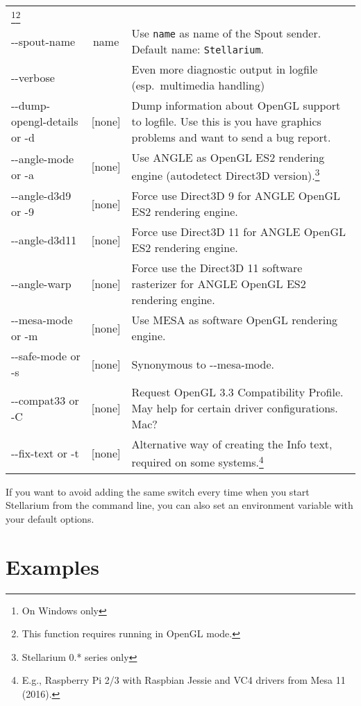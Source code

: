 \begin{longtable}{l|c|p{68mm}}
                                    \footnote{On Windows only}\footnote{This function requires running in OpenGL mode.}\\
-\/-spout-name       & name       & Use \texttt{name} as name of the Spout sender. Default name: \texttt{Stellarium}.\footnotemark[1]\\\midrule									
-\/-verbose          &            & Even more diagnostic output in logfile (esp.\ multimedia handling)\\
-\/-dump-opengl-details or -d     & {[}none{]} & Dump information about OpenGL support to logfile. 
                                                 Use this is you have graphics problems and want to send a bug report. \\\midrule
-\/-angle-mode or -a & {[}none{]} & Use ANGLE as OpenGL ES2 rendering engine (autodetect Direct3D version).\footnotemark[1]\footnote{Stellarium 0.* series only}\\
-\/-angle-d3d9 or -9 & {[}none{]} & Force use Direct3D 9 for ANGLE OpenGL ES2 rendering engine.\footnotemark[1]\footnotemark[3]\\
-\/-angle-d3d11      & {[}none{]} & Force use Direct3D 11 for ANGLE OpenGL ES2 rendering engine.\footnotemark[1]\footnotemark[3]\\
-\/-angle-warp       & {[}none{]} & Force use the Direct3D 11 software rasterizer for ANGLE OpenGL ES2 rendering engine.\footnotemark[1]\footnotemark[3]\\
-\/-mesa-mode or -m  & {[}none{]} & Use MESA as software OpenGL rendering engine.\footnotemark[1]\\
-\/-safe-mode or -s  & {[}none{]} & Synonymous to -\/-mesa-mode.\footnotemark[1]\\
-\/-compat33 or -C   & {[}none{]} & Request OpenGL 3.3 Compatibility Profile. May help for certain driver configurations. Mac?\\
-\/-fix-text or -t   & {[}none{]} & Alternative way of creating the Info text, required on some systems.\footnote{E.g., Raspberry Pi 2/3 with Raspbian Jessie and VC4 drivers from Mesa 11 (2016).}\\\bottomrule
\end{longtable}

\noindent {} If you want to avoid adding the same
switch every time when you start Stellarium from the command line, you
can also set an environment variable  with your
default options. 

\section{Examples}
\label{sec:CommandLineOptions:Examples}

